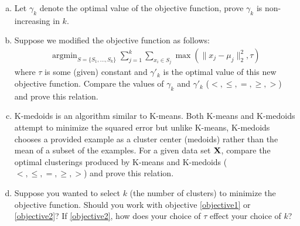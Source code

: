 \documentclass{article}
\newcommand{\X}{{\bf X}}
\begin{document}
	\begin{enumerate}[(a)]
		\item Let $\gamma_k$ denote the optimal value of the objective function, prove $\gamma_k$ is non-increasing in $k$.
		\item Suppose we modified the objective function as follows:
			\begin{eqnarray}
				\mathop{\textrm{argmin}}_{S=\{S_1,...,S_k\}}\sum_{j=1}^k\sum_{x_i\in S_j}\max(\|x_j-\mu_j\|_2^2, \tau)
				\label{objective2}
			\end{eqnarray}
			where $\tau$ is some (given) constant and $\gamma'_k$ is the optimal value of this new objective function. Compare the values of 
			$\gamma_k$ and $\gamma'_k$ ($<, \le, =, \ge, >$) and prove this relation.
		\item K-medoids is an algorithm similar to K-means. Both K-means and K-medoids attempt to minimize the squared error but unlike K-means, K-medoids chooses a provided example as a cluster center (medoids) rather than the mean of a subset of the examples. For a given data set $\X$, compare the optimal clusterings produced by K-means and K-medoids ($<, \le, =, \ge, >$) and prove this relation.
		\item Suppose you wanted to select $k$ (the number of clusters) to minimize the objective function. Should you work with objective \ref{objective1} or \ref{objective2}? If \ref{objective2}, how does your choice of $\tau$ effect your choice of $k$?
	\end{enumerate}


	
\end{document}
